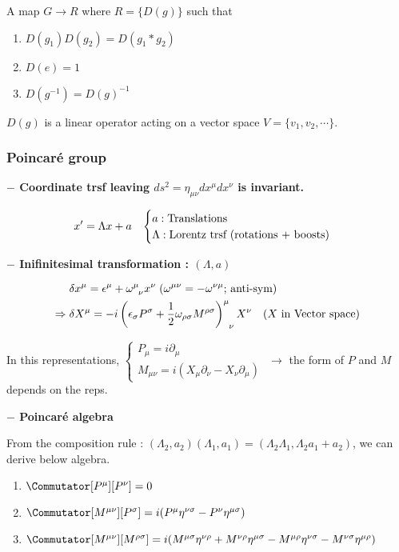 \documentclass[11pt,letterpaper]{article}
\begin{document}
\VS

\begin{definition}[Representation]
	A map $G \rightarrow R$ where $R = \{D(g)\}$ such that
	\begin{enumerate}
		\item $D(g_1)D(g_2) = D(g_1*g_2)$
		\item $D(e) = 1$
		\item $D(g^{-1}) = D(g)^{-1}$
	\end{enumerate}
	
	$D(g)$ is a linear operator acting on a vector space
	$V=\{v_1, v_2, \cdots \}$.
\end{definition}

\VS\VS

\subsubsection{Poincar\'{e} group}

\vs

{\bfseries $-$ Coordinate trsf leaving $ds^2 = \eta_{\mu\nu}dx^\mu dx^\nu$ is invariant.}

$$
x'=\Lambda x + a \hspace{0.3cm}
\begin{cases}
	a: \text{Translations} \\
	\Lambda: \text{Lorentz trsf (rotations + boosts)}
\end{cases}
$$
\newpage

{\bfseries$-$ Inifinitesimal transformation : $(\Lambda, a)$}

$$
\begin{aligned}
	&\delta x^\mu = \eps^\mu + \tensor{\omega}{^\mu _\nu}x^\nu \hs (\omega^{\mu\nu} = -\omega^{\nu\mu}\text{; anti-sym}) \\
	\Rightarrow \hs &\delta X^\mu = -i\tensor{\left(\eps_\sigma P^\sigma + \frac{1}{2}\omega_{\rho\sigma}M^{\rho\sigma} \right)}{^\mu _\nu}X^\nu \quad \text{($X$ in Vector space)}
\end{aligned}
$$

In this representations, 
$
\begin{cases}
	P_\mu = i\partial_\mu \\
	M_{\mu\nu} = i(X_\mu\partial_\nu - X_\nu\partial_\mu)
\end{cases}
$
\hs $\rightarrow$ the form of $P$ and $M$ depends on the reps.

\VS\VS

{\bfseries $-$ Poincar\'{e} algebra}

From the composition rule : $(\Lambda_2, a_2)(\Lambda_1, a_1) = (\Lambda_2\Lambda_1, \Lambda_2a_1 + a_2)$, we can derive below algebra.
\begin{enumerate}
	\item $\Commutator[P^\mu][P^\nu] = 0$
	\item $\Commutator[M^{\mu\nu}][P^{\sigma}] = i(P^\mu\eta^{\nu\sigma}-P^\nu\eta^{\mu\sigma})$
	\item $\Commutator[M^{\mu\nu}][M^{\rho\sigma}] = i(M^{\mu\sigma}\eta^{\nu\rho} + M^{\nu\rho}\eta^{\mu\sigma} - M^{\mu\rho}\eta^{\nu\sigma} - M^{\nu\sigma}\eta^{\mu\rho})$
\end{enumerate}
\end{document}
